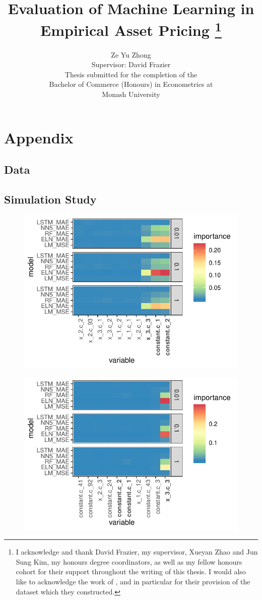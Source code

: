 \documentclass[11pt, a4paper, table]{article}
\title{Evaluation of Machine Learning in Empirical Asset Pricing
\thanks{I acknowledge and thank David Frazier, my supervisor, Xueyan Zhao and Jun Sung Kim, my honours degree coordinators, as well as my fellow honours cohort for their support throughout the writing of this thesis. I would also like to acknowledge the work of \cite{gu_empirical_2018}, and in particular for their provision of the dataset which they constructed.}
}
\author{Ze Yu Zhong \\
Supervisor: David Frazier \\ 
Thesis submitted for the completion of the \\
Bachelor of Commerce (Honours) in Econometrics at \\
Monash University}
\begin{document}
\section{Appendix}

\subsection{Data}

\subsection{Simulation Study}





\newpage



\FloatBarrier


\begin{figure}
	\includegraphics[]{../Results/simulation/graphics/simulation_g1_vi.pdf}
\end{figure}

\begin{figure}
	\includegraphics[]{../Results/simulation/graphics/simulation_g2_vi.pdf}
\end{figure}
\end{document}
